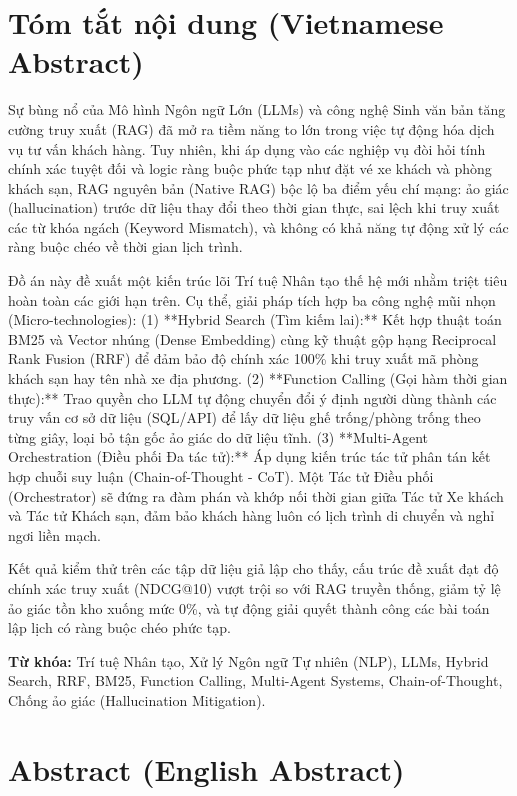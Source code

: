 \section*{Tóm tắt nội dung (Vietnamese Abstract)}

Sự bùng nổ của Mô hình Ngôn ngữ Lớn (LLMs) và công nghệ Sinh văn bản tăng cường truy xuất (RAG) đã mở ra tiềm năng to lớn trong việc tự động hóa dịch vụ tư vấn khách hàng. Tuy nhiên, khi áp dụng vào các nghiệp vụ đòi hỏi tính chính xác tuyệt đối và logic ràng buộc phức tạp như đặt vé xe khách và phòng khách sạn, RAG nguyên bản (Native RAG) bộc lộ ba điểm yếu chí mạng: ảo giác (hallucination) trước dữ liệu thay đổi theo thời gian thực, sai lệch khi truy xuất các từ khóa ngách (Keyword Mismatch), và không có khả năng tự động xử lý các ràng buộc chéo về thời gian lịch trình.

Đồ án này đề xuất một kiến trúc lõi Trí tuệ Nhân tạo thế hệ mới nhằm triệt tiêu hoàn toàn các giới hạn trên. Cụ thể, giải pháp tích hợp ba công nghệ mũi nhọn (Micro-technologies):
(1) **Hybrid Search (Tìm kiếm lai):** Kết hợp thuật toán BM25 và Vector nhúng (Dense Embedding) cùng kỹ thuật gộp hạng Reciprocal Rank Fusion (RRF) để đảm bảo độ chính xác 100\% khi truy xuất mã phòng khách sạn hay tên nhà xe địa phương.
(2) **Function Calling (Gọi hàm thời gian thực):** Trao quyền cho LLM tự động chuyển đổi ý định người dùng thành các truy vấn cơ sở dữ liệu (SQL/API) để lấy dữ liệu ghế trống/phòng trống theo từng giây, loại bỏ tận gốc ảo giác do dữ liệu tĩnh.
(3) **Multi-Agent Orchestration (Điều phối Đa tác tử):** Áp dụng kiến trúc tác tử phân tán kết hợp chuỗi suy luận (Chain-of-Thought - CoT). Một Tác tử Điều phối (Orchestrator) sẽ đứng ra đàm phán và khớp nối thời gian giữa Tác tử Xe khách và Tác tử Khách sạn, đảm bảo khách hàng luôn có lịch trình di chuyển và nghỉ ngơi liền mạch.

Kết quả kiểm thử trên các tập dữ liệu giả lập cho thấy, cấu trúc đề xuất đạt độ chính xác truy xuất (NDCG@10) vượt trội so với RAG truyền thống, giảm tỷ lệ ảo giác tồn kho xuống mức 0\%, và tự động giải quyết thành công các bài toán lập lịch có ràng buộc chéo phức tạp.

\textbf{Từ khóa:} Trí tuệ Nhân tạo, Xử lý Ngôn ngữ Tự nhiên (NLP), LLMs, Hybrid Search, RRF, BM25, Function Calling, Multi-Agent Systems, Chain-of-Thought, Chống ảo giác (Hallucination Mitigation).

\vspace{1cm}
\section*{Abstract (English Abstract)}

